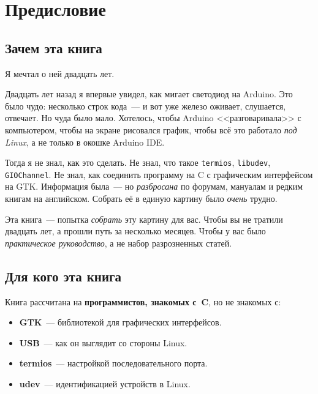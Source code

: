 
\chapter*{Предисловие}

\section*{Зачем эта книга}

Я мечтал о ней двадцать лет.

Двадцать лет назад я впервые увидел, как мигает светодиод
на Arduino. Это было чудо: несколько строк кода~--- и вот
уже железо оживает, слушается, отвечает. Но чуда было мало.
Хотелось, чтобы Arduino <<разговаривала>> с компьютером, чтобы
на экране рисовался график, чтобы всё это работало \emph{под
Linux}, а не только в окошке Arduino IDE.

Тогда я не знал, как это сделать. Не знал, что такое
\texttt{termios}, \texttt{libudev}, \texttt{GIOChannel}.
Не знал, как соединить программу на C с графическим
интерфейсом на GTK. Информация была~--- но \emph{разбросана}
по форумам, мануалам и редким книгам на английском. Собрать
её в единую картину было \emph{очень} трудно.

Эта книга~--- попытка \emph{собрать} эту картину для вас.
Чтобы вы не тратили двадцать лет, а прошли путь за несколько
месяцев. Чтобы у вас было \emph{практическое руководство},
а не набор разрозненных статей.

\section*{Для кого эта книга}

Книга рассчитана на \textbf{программистов, знакомых с~C}, но
не знакомых с:

\begin{itemize}
    \item \textbf{GTK}~--- библиотекой для графических интерфейсов.
    \item \textbf{USB}~--- как он выглядит со стороны Linux.
    \item \textbf{termios}~--- настройкой последовательного порта.
    \item \textbf{udev}~--- идентификацией устройств в Linux.
\end{itemize}

